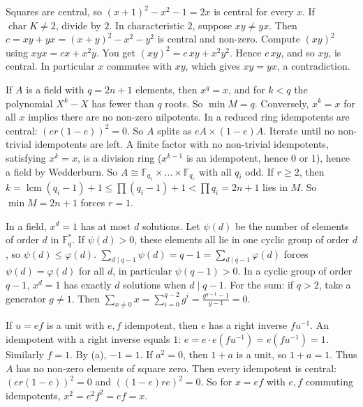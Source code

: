 \documentclass[11pt,a4paper]{article}
\begin{document}
 Squares are central, so $(x+1)^2-x^2-1=2x$ is central for every $x$. If $\operatorname{char}K\ne2$, divide by $2$.
 In characteristic $2$, suppose $xy\ne yx$. Then $c=xy+yx=(x+y)^2-x^2-y^2$ is central and non-zero. Compute $(xy)^2$ using $xyx=cx+x^2y$.
 You get $(xy)^2=c\,xy+x^2y^2$. Hence $c\,xy$, and so $xy$, is central. In particular $x$ commutes with $xy$, which gives $xy=yx$, a contradiction.

 If $A$ is a field with $q=2n+1$ elements, then $x^q=x$, and for $k<q$ the polynomial $X^k-X$ has fewer than $q$ roots. So $\min M=q$.
 Conversely, $x^k=x$ for all $x$ implies there are no non-zero nilpotents. In a reduced ring idempotents are central: $(er(1-e))^2=0$. So $A$ splits as $eA\times(1-e)A$. Iterate until no non-trivial idempotents are left.
 A finite factor with no non-trivial idempotents, satisfying $x^{k}=x$, is a division ring ($x^{k-1}$ is an idempotent, hence $0$ or $1$), hence a field by Wedderburn. So $A\cong\mathbb F_{q_1}\times\dots\times\mathbb F_{q_r}$ with all $q_i$ odd.
 If $r\ge2$, then $k=\operatorname{lcm}(q_i-1)+1\le\prod(q_i-1)+1<\prod q_i=2n+1$ lies in $M$. So $\min M=2n+1$ forces $r=1$.

 In a field, $x^d=1$ has at most $d$ solutions. Let $\psi(d)$ be the number of elements of order $d$ in $\mathbb F_q^*$. If $\psi(d)>0$, these elements all lie in one cyclic group of order $d$, so $\psi(d)\le\varphi(d)$.
 $\sum_{d\mid q-1}\psi(d)=q-1=\sum_{d\mid q-1}\varphi(d)$ forces $\psi(d)=\varphi(d)$ for all $d$, in particular $\psi(q-1)>0$. In a cyclic group of order $q-1$, $x^d=1$ has exactly $d$ solutions when $d\mid q-1$.
 For the sum: if $q>2$, take a generator $g\ne1$. Then $\sum_{x\ne0}x=\sum_{i=0}^{q-2}g^i=\frac{g^{q-1}-1}{g-1}=0$.

 If $u=ef$ is a unit with $e,f$ idempotent, then $e$ has a right inverse $fu^{-1}$. An idempotent with a right inverse equals $1$: $e=e\cdot e(fu^{-1})=e(fu^{-1})=1$. Similarly $f=1$.
 By (a), $-1=1$. If $a^2=0$, then $1+a$ is a unit, so $1+a=1$. Thus $A$ has no non-zero elements of square zero.
 Then every idempotent is central: $(er(1-e))^2=0$ and $((1-e)re)^2=0$. So for $x=ef$ with $e,f$ commuting idempotents, $x^2=e^2f^2=ef=x$.
\end{document}
